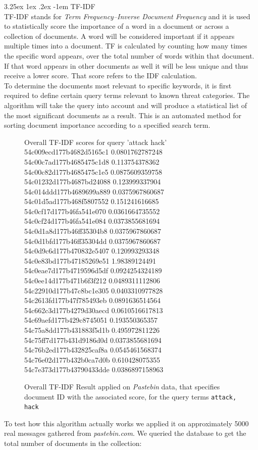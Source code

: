 \documentclass[12pt]{article}
\makeatletter
\renewcommand\paragraph{\@startsection{paragraph}{5}{\z@}%
  {3.25ex \@plus1ex \@minus.2ex}%
  {-1em}%
  {\normalfont\normalsize\bfseries}}
\makeatother
\begin{document}
\paragraph{TF-IDF}
\hfill \break
\\
TF-IDF \cite{tf-idf} stands for \textit{Term Frequency–Inverse Document Frequency} and it is used to statistically score the importance of a word in a document or across a collection of documents. A word will be considered important if it appears multiple times into a document. TF is calculated by counting how many times the specific word appears, over the total number of words within that document. If that word appears in other documents as well it will be less unique and thus receive a lower score. That score refers to the IDF calculation. 
\hfill \break 
\\
To determine the documents most relevant to specific keywords, it is first required to define certain query terms relevant to known threat categories. The algorithm will take the query into account and will produce a statistical list of the most significant documents as a result. This is an automated method for sorting document importance according to a specified search term. 
\begin{figure}[h!] 
\begin{footnotesize}
\begin{spverbatim}
Overall TF-IDF scores for query 'attack hack'
54c009ecd177b4682d5165c1 0.0801762787248
54c00c7ad177b4685475c1d8 0.113754378362
54c00c82d177b4685475c1e5 0.0875609359758
54c01232d177b4687bd24088 0.123999337904
54c014ddd177b4689699a889 0.0375967860687
54c01d5ad177b468f5807552 0.151241616685
54c0cf17d177b46fa541e070 0.0361664735552
54c0cf24d177b46fa541e084 0.0373855681694
54c0d1a8d177b46ff35304b8 0.0375967860687
54c0d1bfd177b46ff35304dd 0.0375967860687
54c0d9c6d177b470832e5407 0.120993293348
54c0e83bd177b47185269e51 1.98389124491
54c0eae7d177b4719596d5df 0.0924254324189
54c0ee14d177b471b6f3f212 0.0489311112806
54c22910d177b47c8bc1e305 0.0403310977828
54c2613fd177b47f785493eb 0.0891636514564
54c662c3d177b4279d30aecd 0.0610516617813
54c69aefd177b429c8745051 0.193550365357
54c75a8dd177b431883f5d1b 0.495972811226
54c75ff7d177b431d9186d0d 0.0373855681694
54c76b2ed177b432825caf8a 0.0545461568374
54c76e02d177b432b0ca7d0b 0.610428075355
54c7e373d177b43790433dde 0.0386897158963
\end{spverbatim}
\end{footnotesize}
\captionsetup{font=small}
\caption{Overall TF-IDF Result applied on \textit{Pastebin} data, that specifies document ID with the associated score, for the query terms \texttt{attack, hack}}
\label{fig:overall}
\end{figure}
To test how this algorithm actually works we applied it on approximately 5000 real messages gathered from \textit{pastebin.com}. We queried the database to get the total number of documents in the collection:
\end{document}
